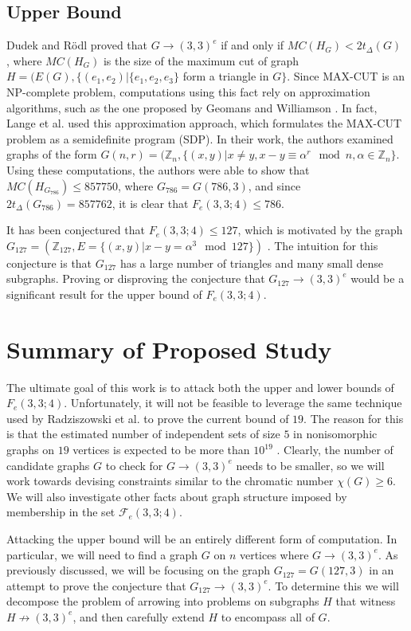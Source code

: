 \documentclass[paper=a4, fontsize=11pt]{scrartcl} %
\begin{document}
\subsection{Upper Bound}
Dudek and R\"{o}dl proved that $G \to (3,3)^e$ if and only if $MC(H_G) < 2t_{\Delta}(G)$ \cite{dudek08},
where $MC(H_G)$ is the size of the maximum cut of graph $H = (E(G), \{(e_1, e_2) | \{e_1, e_2, e_3\}$ form a triangle
in $G\}$. Since MAX-CUT is an NP-complete problem, computations using this fact rely on approximation
algorithms, such as the one proposed by Geomans and Williamson \cite{geomans95-maxcut}. 
In fact, Lange et al. \cite{arlFolkman}
used this approximation approach, which formulates the MAX-CUT problem as a semidefinite program (SDP).
In their work, the authors examined graphs of the form 
$G(n, r) = (\mathbb{Z}_{n}, \{(x,y) | x \not= y, x - y \equiv \alpha^r \mod n, \alpha \in \mathbb{Z}_{n}\}$.
Using these computations, the authors were able to show that $MC(H_{G_{786}}) \leq 857750$, where
$G_{786} = G(786, 3)$, and since $2t_{\Delta}(G_{786}) = 857762$, it is clear that $F_e(3,3;4) \leq 786$. 

It has been conjectured that $F_e(3,3;4) \leq 127$, which is motivated by the graph 
$G_{127} = (\mathbb{Z}_{127}, E = \{(x,y) | x - y = \alpha^3 \mod 127\})$ \cite{spr07}.
The intuition for this conjecture is that $G_{127}$ has a large number of triangles and many small dense subgraphs.
Proving or disproving the conjecture that $G_{127} \to (3,3)^e$ would be a significant result for the upper bound of
$F_e(3,3;4)$.

\section{Summary of Proposed Study}
The ultimate goal of this work is to attack both the upper and lower bounds of $F_e(3,3;4)$. 
Unfortunately, it will not be feasible to leverage the same technique used by Radziszowski 
et al. to prove the current bound of $19$. The reason for this is that the estimated number of independent
sets of size $5$ in nonisomorphic graphs on $19$ vertices is expected to be more than $10^{19}$ \cite{spr1995}.
Clearly, the number of candidate graphs $G$ to check for $G \to (3,3)^e$ needs to be smaller, so we will
work towards devising constraints similar to the chromatic number $\chi(G) \geq 6$. We will also investigate
other facts about graph structure imposed by membership in the set $\mathcal{F}_e(3,3;4)$. 

Attacking the upper bound will be an entirely different form of computation. In particular, we will need to find a 
graph $G$ on $n$ vertices where $G \to (3,3)^e$. As previously discussed, we will be focusing on the graph 
$G_{127} = G(127,3)$ in an attempt to prove the conjecture that $G_{127} \to (3,3)^e$. 
To determine this we will decompose the problem of arrowing into problems on subgraphs $H$ that 
witness $H \not \to (3,3)^e$, and then carefully extend $H$ to encompass all of $G$. 
\end{document}
